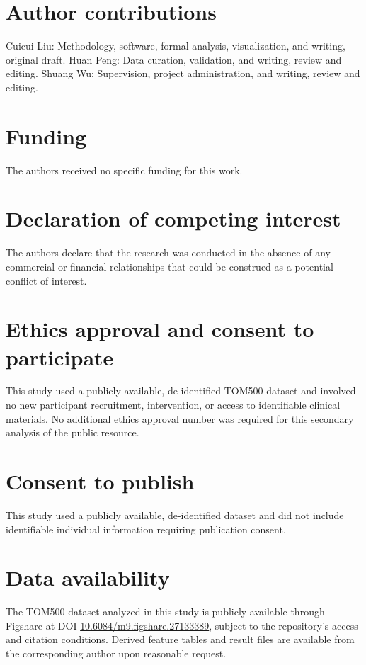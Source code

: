 \documentclass[utf8]{FrontiersinVancouver}
\begin{document}
\section*{Author contributions}
Cuicui Liu: Methodology, software, formal analysis, visualization, and writing, original draft. Huan Peng: Data curation, validation, and writing, review and editing. Shuang Wu: Supervision, project administration, and writing, review and editing.

\section*{Funding}
The authors received no specific funding for this work.

\section*{Declaration of competing interest}
The authors declare that the research was conducted in the absence of any commercial or financial relationships that could be construed as a potential conflict of interest.

\section*{Ethics approval and consent to participate}
This study used a publicly available, de-identified TOM500 dataset and involved no new participant recruitment, intervention, or access to identifiable clinical materials. No additional ethics approval number was required for this secondary analysis of the public resource.

\section*{Consent to publish}
This study used a publicly available, de-identified dataset and did not include identifiable individual information requiring publication consent.

\section*{Data availability}
The TOM500 dataset analyzed in this study is publicly available through Figshare at DOI \href{https://doi.org/10.6084/m9.figshare.27133389}{10.6084/m9.figshare.27133389}, subject to the repository's access and citation conditions. Derived feature tables and result files are available from the corresponding author upon reasonable request.
\end{document}
